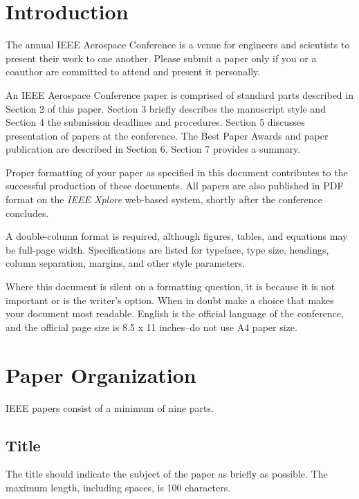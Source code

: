 \documentclass[twocolumn,letterpaper]{IEEEAerospaceCLS}  %
\begin{document}
\tableofcontents

\section{Introduction}
The annual IEEE Aerospace Conference is a venue for engineers and scientists to present their work to one another. Please submit a paper only if you or a coauthor are committed to attend and present it personally.

An IEEE Aerospace Conference paper is comprised of standard parts described in Section 2 of this paper. Section 3 briefly describes the manuscript style and Section 4 the submission deadlines and procedures. Section 5 discusses presentation of papers at the conference. The Best Paper Awards and paper publication are described in Section 6. Section 7 provides a summary.

Proper formatting of your paper as specified in this document contributes to the successful production of these documents. All papers are also published in PDF format on the {\it IEEE Xplore} web-based system, shortly after the conference concludes.

A double-column format is required, although figures, tables, and equations may be full-page width. Specifications are listed for typeface, type size, headings, column separation, margins, and other style parameters.

Where this document is silent on a formatting question, it is because it is not important or is the writer's option. When in doubt make a choice that makes your document most readable. English is the official language of the conference, and the official page size is 8.5 x 11 inches--do not use A4 paper size.



\section{Paper Organization}
IEEE papers consist of a minimum of nine parts.

\subsection{Title}
The title should indicate the subject of the paper as briefly as possible. The maximum length, including spaces, is 100 characters.
\end{document}
